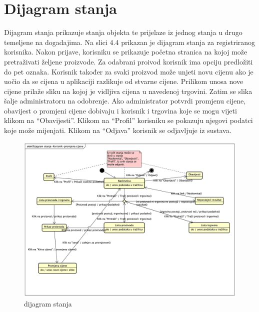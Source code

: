 			
			
			\eject
		
		\section{Dijagram stanja}
			
			
			
			
			Dijagram stanja prikazuje stanja objekta te prijelaze iz jednog stanja u drugo temeljene na dogadajima. Na slici 4.4 prikazan je dijagram stanja za registriranog korisnika. Nakon prijave, korisniku se prikazuje početna stranica na kojoj može pretraživati željene proizvode. Za odabrani proivod korisnik ima opciju predložiti do pet oznaka. Korisnik također za svaki proizvod može unjeti novu cijenu ako je uočio da se cijena u aplikaciji razlikuje od stvarne cijene. Prilikom unosa nove cijene prilaže sliku na kojoj je vidljiva cijena u navedenoj trgovini. Zatim se slika šalje administratoru na odobrenje. Ako administrator potvrdi promjenu cijene, obavijest o promjeni cijene dobivaju i korisnik i trgovina koje se mogu vijeti klikom na “Obavijesti”. Klikom na “Profil” korisniku se pokazuju njegovi podatci koje može mijenjati. Klikom na “Odjava” korisnik se odjavljuje iz sustava.
			
			\begin{figure}[H]
				\includegraphics[width=\textwidth]{slike/DijagramStanja.png} %
				\caption{dijagram stanja}
				\label{fig:dijagramStanja} %
			\end{figure}
			
